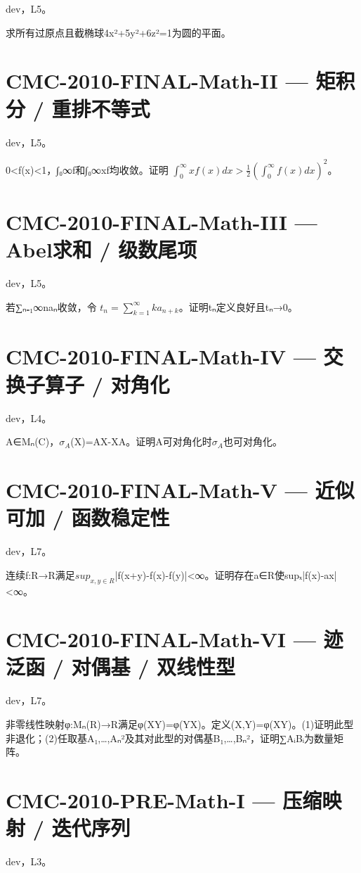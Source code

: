 \documentclass[UTF8]{ctexart}
\begin{document}
dev，L5。

求所有过原点且截椭球4x²+5y²+6z²=1为圆的平面。

\section*{CMC-2010-FINAL-Math-II — 矩积分 / 重排不等式}

dev，L5。

0<f(x)<1，∫₀∞f和∫₀∞xf均收敛。证明 $\int_0^\infty xf(x)dx>\tfrac12(\int_0^\infty f(x)dx)^2$。

\section*{CMC-2010-FINAL-Math-III — Abel求和 / 级数尾项}

dev，L5。

若∑ₙ₌₁∞naₙ收敛，令 $t_n=\sum_{k=1}^\infty ka_{n+k}$。证明tₙ定义良好且tₙ→0。

\section*{CMC-2010-FINAL-Math-IV — 交换子算子 / 对角化}

dev，L4。

A∈Mₙ(C)，$σ_A$(X)=AX-XA。证明A可对角化时$σ_A$也可对角化。

\section*{CMC-2010-FINAL-Math-V — 近似可加 / 函数稳定性}

dev，L7。

连续f:R→R满足$sup_{x,y∈R}$|f(x+y)-f(x)-f(y)|<∞。证明存在a∈R使supₓ|f(x)-ax|<∞。

\section*{CMC-2010-FINAL-Math-VI — 迹泛函 / 对偶基 / 双线性型}

dev，L7。

非零线性映射φ:Mₙ(R)→R满足φ(XY)=φ(YX)。定义(X,Y)=φ(XY)。(1)证明此型非退化；(2)任取基A₁,…,Aₙ²及其对此型的对偶基B₁,…,Bₙ²，证明∑AᵢBᵢ为数量矩阵。

\section*{CMC-2010-PRE-Math-I — 压缩映射 / 迭代序列}

dev，L3。
\end{document}
